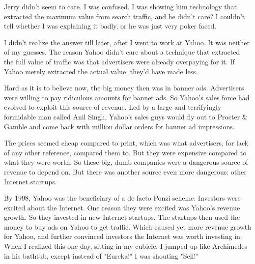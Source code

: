 Jerry
                    didn't seem to care. I was confused. I was showing him
                    technology that extracted the maximum value from search
                    traffic, and he didn't care? I couldn't tell whether I was
                    explaining it badly, or he was just very poker faced.

I
                    didn't realize the answer till later, after I went to work
                    at Yahoo. It was neither of my guesses. The reason Yahoo
                    didn't care about a technique that extracted the full value
                    of traffic was that advertisers were already overpaying for
                    it. If Yahoo merely extracted the actual value, they'd have
                    made less.

Hard as it is to believe now, the big
                    money then was in banner ads. Advertisers were willing to
                    pay ridiculous amounts for banner ads. So Yahoo's sales
                    force had evolved to exploit this source of revenue. Led by
                    a large and terrifyingly formidable man called Anil Singh,
                    Yahoo's sales guys would fly out to Procter \& Gamble and
                    come back with million dollar orders for banner ad
                    impressions.

The prices seemed cheap compared to
                    print, which was what advertisers, for lack of any other
                    reference, compared them to. But they were expensive
                    compared to what they were worth. So these big, dumb
                    companies were a dangerous source of revenue to depend on.
                    But there was another source even more dangerous: other
                    Internet startups.

By 1998, Yahoo was the
                    beneficiary of a de facto Ponzi scheme. Investors were
                    excited about the Internet. One reason they were excited was
                    Yahoo's revenue growth. So they invested in new Internet
                    startups. The startups then used the money to buy ads on
                    Yahoo to get traffic. Which caused yet more revenue growth
                    for Yahoo, and further convinced investors the Internet was
                    worth investing in. When I realized this one day, sitting in
                    my cubicle, I jumped up like Archimedes in his bathtub,
                    except instead of "Eureka!" I was shouting "Sell!"

